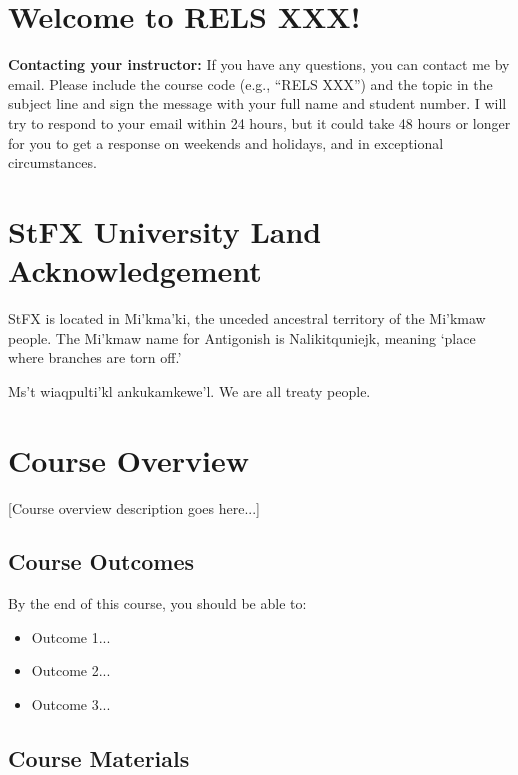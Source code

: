 \documentclass[12pt]{article}
\begin{document}

\section*{Welcome to RELS XXX!}


\textbf{Contacting your instructor:} If you have any questions, you can contact me by email. Please include the course code (e.g., ``RELS XXX'') and the topic in the subject line and sign the message with your full name and student number. I will try to respond to your email within 24 hours, but it could take 48 hours or longer for you to get a response on weekends and holidays, and in exceptional circumstances.

\section*{StFX University Land Acknowledgement}

StFX is located in Mi’kma’ki, the unceded ancestral territory of the Mi'kmaw people. The Mi'kmaw name for Antigonish is Nalikitquniejk, meaning ‘place where branches are torn off.’

Ms't wiaqpulti'kl ankukamkewe'l. We are all treaty people.

\section*{Course Overview}

[Course overview description goes here...]

\subsection*{Course Outcomes}

By the end of this course, you should be able to:
\begin{itemize}
  \item Outcome 1...
  \item Outcome 2...
  \item Outcome 3...
\end{itemize}

\subsection*{Course Materials}
\end{document}
